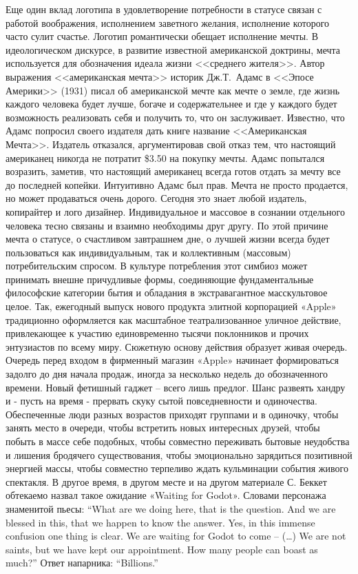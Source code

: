 Еще один вклад логотипа в удовлетворение потребности в статусе связан с работой
воображения, исполнением заветного желания, исполнение которого часто сулит
счастье. Логотип романтически обещает исполнение мечты. В идеологическом
дискурсе, в развитие известной американской доктрины, мечта используется для
обозначения идеала жизни <<среднего жителя>>. Автор выражения <<американская
мечта>> историк Дж.Т.~Адамс в <<Эпосе Америки>> (1931) писал об американской
мечте как мечте о земле, где жизнь каждого человека будет лучше, богаче и
содержательнее и где у каждого будет возможность реализовать себя и получить
то, что он
заслуживает.\autocite{adams1938epic} Известно, что Адамс попросил своего
издателя дать книге название <<Американская Мечта>>. Издатель отказался,
аргументировав свой отказ тем, что настоящий американец никогда не потратит \$3.50
на покупку мечты. Адамс попытался возразить, заметив, что настоящий американец
всегда готов отдать за мечту все до последней копейки. Интуитивно Адамс был прав.
Мечта не просто продается, но может продаваться очень дорого. Сегодня это знает любой издатель, копирайтер и лого дизайнер. Индивидуальное и массовое в сознании отдельного человека тесно связаны и взаимно необходимы друг другу. По этой причине мечта о статусе, о счастливом завтрашнем дне, о лучшей жизни всегда будет пользоваться как индивидуальным, так и коллективным (массовым) потребительским спросом.  В культуре потребления этот симбиоз может принимать внешне причудливые формы, соединяющие фундаментальные философские категории бытия и обладания в экстравагантное масскультовое  целое. Так, ежегодный выпуск нового продукта элитной корпорацией  «Apple» традиционно оформляется как масштабное театрализованное уличное действие, привлекающее к участию единовременно  тысячи поклонников и прочих энтузиастов по всему миру. Сюжетную основу  действия образует живая очередь. Очередь перед  входом в фирменный магазин «Apple» начинает формироваться задолго до дня начала продаж, иногда за несколько недель до обозначенного времени. Новый фетишный гаджет – всего лишь предлог. Шанс развеять хандру и - пусть на время - прервать скуку сытой повседневности и одиночества.   Обеспеченные люди разных возрастов приходят группами и в одиночку, чтобы занять место в очереди, чтобы встретить новых интересных друзей, чтобы побыть в массе себе подобных, чтобы совместно переживать бытовые неудобства и лишения бродячего существования, чтобы эмоционально зарядиться позитивной энергией массы, чтобы совместно терпеливо ждать кульминации события живого спектакля.  В другое время, в другом месте и на другом материале С. Беккет обтекаемо назвал такое ожидание «Waiting for Godot».  Словами персонажа знаменитой пьесы: “What are we doing here, that is the question. And we are blessed in this, that we happen to know the answer. Yes, in this immense confusion one thing is clear. We are waiting for Godot to come – (…) We are not saints, but we have kept our appointment. How many people can boast as much?”  Ответ напарника: “Billions.”\autocite{beckett1954}

